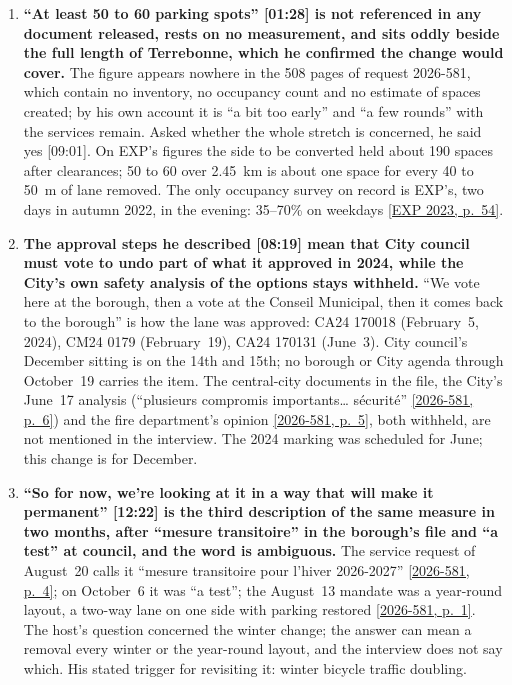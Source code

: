 \documentclass[10pt,letterpaper]{article}
\newcommand{\repourl}{https://github.com/OpenMobilityData/Terrebonne-open-sources}
\newcommand{\pagesurl}{https://openmobilitydata.github.io/Terrebonne-access-requests}
\newcommand{\cliptime}[1]{\textsf{\small[#1]}}
\newcommand{\pgl}[2]{\href{\pagesurl/2026-581/raw/01_emails_mandate_counts.pdf\#page=#1}{\textsf{\small[2026-581, p.~#2]}}}
\newcommand{\pg}[1]{\pgl{#1}{#1}}
\newcommand{\exppg}[1]{\href{\repourl/blob/main/2023-exp-mobility-study/raw/EXP_Etude_de_mobilite_rue_de_Terrebonne_2023.pdf}{\textsf{\small[EXP 2023, p.~#1]}}}
\begin{document}
\begin{enumerate}[nosep,itemsep=0.3em,leftmargin=1.4em]
  \item \begin{minipage}[t]{\linewidth}\textbf{``At least 50 to 60 parking spots'' \cliptime{01:28} is not referenced in any document released, rests on no measurement, and sits oddly beside the full length of Terrebonne, which he confirmed the change would cover.} The figure appears nowhere in the 508 pages of request 2026-581, which contain no inventory, no occupancy count and no estimate of spaces created; by his own account it is ``a bit too early'' and ``a few rounds'' with the services remain. Asked whether the whole stretch is concerned, he said yes \cliptime{09:01}. On EXP's figures the side to be converted held about 190 spaces after clearances; 50 to 60 over 2.45~km is about one space for every 40 to 50~m of lane removed. The only occupancy survey on record is EXP's, two days in autumn 2022, in the evening: 35--70\% on weekdays \exppg{54}.\end{minipage}\vspace{0.35em}
  \item \begin{minipage}[t]{\linewidth}\textbf{The approval steps he described \cliptime{08:19} mean that City council must vote to undo part of what it approved in 2024, while the City's own safety analysis of the options stays withheld.} ``We vote here at the borough, then a vote at the Conseil Municipal, then it comes back to the borough'' is how the lane was approved: CA24 170018 (February~5, 2024), CM24 0179 (February~19), CA24 170131 (June~3). City council's December sitting is on the 14th and 15th; no borough or City agenda through October~19 carries the item. The central-city documents in the file, the City's June~17 analysis (``plusieurs compromis importants… sécurité'' \pg{6}) and the fire department's opinion \pg{5}, both withheld, are not mentioned in the interview. The 2024 marking was scheduled for June; this change is for December.\end{minipage}\vspace{0.35em}
  \item \begin{minipage}[t]{\linewidth}\textbf{``So for now, we're looking at it in a way that will make it permanent'' \cliptime{12:22} is the third description of the same measure in two months, after ``mesure transitoire'' in the borough's file and ``a test'' at council, and the word is ambiguous.} The service request of August~20 calls it ``mesure transitoire pour l'hiver 2026-2027'' \pg{4}; on October~6 it was ``a test''; the August~13 mandate was a year-round layout, a two-way lane on one side with parking restored \pg{1}. The host's question concerned the winter change; the answer can mean a removal every winter or the year-round layout, and the interview does not say which. His stated trigger for revisiting it: winter bicycle traffic doubling.\end{minipage}\vspace{0.35em}

\end{enumerate}
\end{document}
